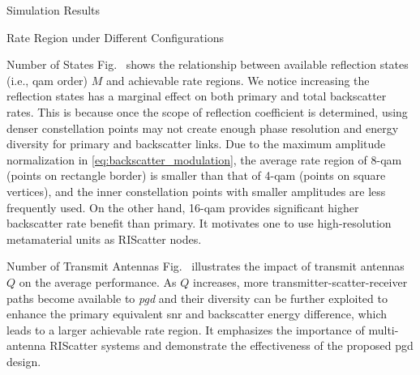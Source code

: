 \documentclass[journal,12pt,onecolumn,draftclsnofoot]{IEEEtran}
\theoremstyle{remark}
\begin{document}
\begin{section}{Simulation Results}
\begin{subsection}{Rate Region under Different Configurations}
		\begin{subsubsection}{Number of States}
			Fig.~ shows the relationship between available reflection states (i.e., \gls{qam} order) $M$ and achievable rate regions.
			We notice increasing the reflection states has a marginal effect on both primary and total backscatter rates.
			This is because once the scope of reflection coefficient is determined, using denser constellation points may not create enough phase resolution and energy diversity for primary and backscatter links.
			Due to the maximum amplitude normalization in \eqref{eq:backscatter_modulation}, the average rate region of \num{8}-\gls{qam} (points on rectangle border) is smaller than that of \num{4}-\gls{qam} (points on square vertices), and the inner constellation points with smaller amplitudes are less frequently used.
			On the other hand, \num{16}-\gls{qam} provides significant higher backscatter rate benefit than primary.
			It motivates one to use high-resolution metamaterial units as RIScatter nodes.
		\end{subsubsection}

		\begin{subsubsection}{Number of Transmit Antennas}
			Fig.~ illustrates the impact of transmit antennas $Q$ on the average performance.
			As $Q$ increases, more transmitter-scatter-receiver paths become available to \emph{\gls{pgd}} and their diversity can be further exploited to enhance the primary equivalent \gls{snr} and backscatter energy difference, which leads to a larger achievable rate region.
			It emphasizes the importance of multi-antenna RIScatter systems and demonstrate the effectiveness of the proposed \gls{pgd} design.
		\end{subsubsection}


\end{subsection}
\end{section}
\end{document}
